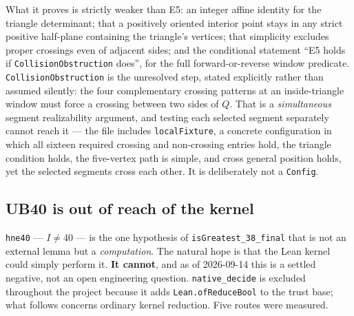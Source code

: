 \documentclass[11pt,a4paper]{article}
\theoremstyle{plain}
\theoremstyle{definition}
\theoremstyle{remark}
\begin{document}
What it proves is strictly weaker than \textsf{E5}: an integer affine identity
for the triangle determinant; that a positively oriented interior point stays in
any strict positive half-plane containing the triangle's vertices; that
simplicity excludes proper crossings even of adjacent sides; and the conditional
statement ``\textsf{E5} holds if \texttt{CollisionObstruction} does'', for the
full forward-or-reverse window predicate. \texttt{CollisionObstruction} is the
unresolved step, stated explicitly rather than assumed silently: the four
complementary crossing patterns at an inside-triangle window must force a
crossing between two sides of $Q$. That is a \emph{simultaneous} segment
realizability argument, and testing each selected segment separately cannot
reach it --- the file includes \texttt{localFixture}, a concrete configuration in
which all sixteen required crossing and non-crossing entries hold, the triangle
condition holds, the five-vertex path is simple, and cross general position
holds, yet the selected segments cross each other. It is deliberately not a
\texttt{Config}.

\subsection*{\textsf{UB40} is out of reach of the kernel}\label{sec:hne40}

\texttt{hne40} --- $I\neq40$ --- is the one hypothesis of
\texttt{isGreatest\_38\_final} that is not an external lemma but a
\emph{computation}. The natural hope is that the Lean kernel could simply
perform it. \textbf{It cannot}, and as of 2026-09-14 this is a settled negative,
not an open engineering question. \texttt{native\_decide} is excluded throughout
the project because it adds \texttt{Lean.ofReduceBool} to the trust base; what
follows concerns ordinary kernel reduction. Five routes were measured.
\end{document}
